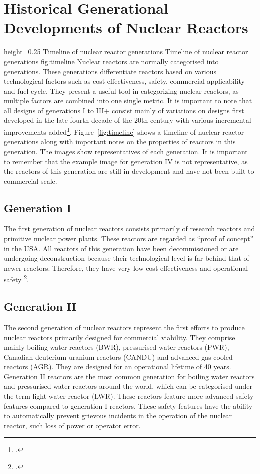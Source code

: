 \chapter{Historical Generational Developments of Nuclear Reactors}
    {height=0.25\textheight}
    {Timeline of nuclear reactor generations}
    {Timeline of nuclear reactor generations}
    {fig:timeline}
Nuclear reactors are normally categorised into generations. These generations differentiate
reactors based on various technological factors such as cost-effectiveness, safety, commercial applicability and
fuel cycle. They present a useful tool in categorizing nuclear reactors, as multiple factors
are combined into one single metric. It is important to note that all designs of generations I
to III+ consist mainly of variations on designs first developed in the late fourth decade of the 20th century with
various incremental improvements added\footcite[1,2]{Gen2gen}.
Figure~\ref{fig:timeline} shows a timeline of nuclear reactor generations along with important notes
on the properties of reactors in this generation. The images show representatives of each generation.
It is important to remember that the example image for generation IV is not representative, as the reactors
of this generation are still in development and have not been built to commercial scale.
\section{Generation I}
The first generation of nuclear reactors consists primarily of research reactors and primitive nuclear
power plants. These reactors are regarded as \enquote{proof of concept} in the USA. All reactors of
this generation have been decommissioned or are undergoing deconstruction because their technological level
is far behind that of newer reactors. Therefore, they have very low cost-effectiveness and operational
safety \footcite[3]{Gen2gen}.
\section{Generation II}
The second generation of nuclear reactors represent the first efforts to produce nuclear reactors primarily
designed for commercial viability. They comprise mainly boiling water reactors (BWR), pressurised water reactors (PWR),
Canadian deuterium uranium reactors (CANDU) and advanced gas-cooled reactors (AGR).  They are designed
for an operational lifetime of 40 years. Generation II reactors are the most common generation for boiling
water reactors and pressurised water reactors around the world, which can be categorised under the term
light water reactor (LWR). These reactors feature more advanced safety features compared to generation I
reactors. These safety features have the ability to automatically prevent grievous incidents in the operation
of the nuclear reactor, such loss of power or operator error.

